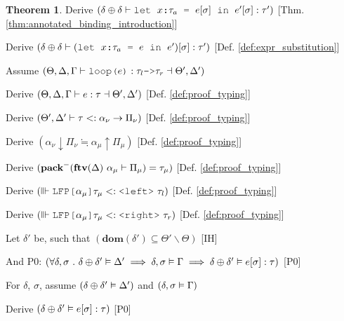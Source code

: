 \documentclass[acmsmall]{acmart}
\theoremstyle{definition}
\newtheorem{theorem}{Theorem}[section]
\begin{document}
\begin{theorem}
  \item \I\I \N Derive $(
    \delta \oplus \delta \entails \J{let } x \J{:} \tau_a \J{ = } e[\sigma] \J{ in } e'[\sigma] \hastype \tau'
  )$ [Thm. \ref{thm:annotated_binding_introduction}]

  \item \I\I \N Derive $(
    \delta \oplus \delta \entails (\J{let } x \J{:} \tau_a \J{ = } e \J{ in } e')[\sigma] \hastype \tau'
  )$ [Def. \ref{def:expr_substitution}]


  \item \N Assume $(
    \Theta, \Delta, \Gamma \entails \J{loop(}e\J{)} \hastype 
    \tau_l \J{->} \tau_r \given \Theta', \Delta'
  )$
  \item \I \N Derive $(
    \Theta, \Delta, \Gamma \vdash e : \tau \dashv  \Theta', \Delta'
  )$ [Def. \ref{def:proof_typing}]
  \item \I \N Derive $(
    \Theta', \Delta' \vdash \tau <: \alpha_\nu \rightarrow \Pi_\nu
  )$ [Def. \ref{def:proof_typing}]
  \item \I \N Derive $(
    \alpha_\nu \downarrow \Pi_\nu \fallingdotseq \alpha_\mu \uparrow \Pi_\mu
  )$ [Def. \ref{def:proof_typing}]
  \item \I \N Derive $(
    \textbf{pack}^-(\textbf{ftv}(\Delta)\ \alpha_\mu \vdash \Pi_\mu) = \tau_\mu
  )$ [Def. \ref{def:proof_typing}]
  \item \I \N Derive $(
    \factorsinto \J{LFP[} \alpha_\mu \J{]}\tau_\mu \subtypes \J{<left>}\ \tau_l
  )$ [Def. \ref{def:proof_typing}]
  \item \I \N Derive $(
    \factorsinto \J{LFP[} \alpha_\mu \J{]}\tau_\mu \subtypes \J{<right>}\ \tau_r
  )$ [Def. \ref{def:proof_typing}]

  \item \I \N Let $\delta'$ be, such that $(
    \textbf{dom}(\delta') \subseteq \Theta' \backslash \Theta
  )$ [IH]
  \item \I \N And P0: $(
    \forall \delta, \sigma \ .\  
    \delta \oplus \delta' \vDash \Delta' \implies
    \delta, \sigma \vDash \Gamma \implies
    \delta \oplus \delta' \vDash e[\sigma] : \tau
  )$ [P0]

  \item \I \N For $\delta$, $\sigma$,
    assume $(\delta \oplus \delta' \vDash \Delta')$
    and $(\delta, \sigma \vDash \Gamma)$

  \item \I\I \N Derive $(
    \delta \oplus \delta' \vDash e[\sigma] : \tau
  )$ [P0]


\end{theorem}
\end{document}
